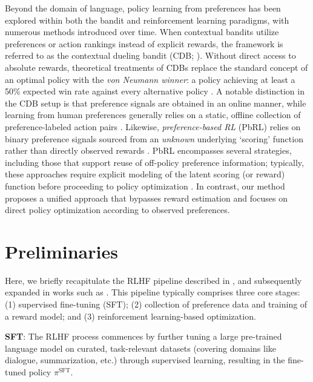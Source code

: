 Beyond the domain of language, policy learning from preferences has been explored within both the bandit and reinforcement learning paradigms, with numerous methods introduced over time. When contextual bandits utilize preferences or action rankings instead of explicit rewards, the framework is referred to as the contextual dueling bandit (CDB; \cite{yue2012karmed,dudik2015contextual}). Without direct access to absolute rewards, theoretical treatments of CDBs replace the standard concept of an optimal policy with the \textit{von Neumann winner}: a policy achieving at least a 50\% expected win rate against every alternative policy \citep{dudik2015contextual}. A notable distinction in the CDB setup is that preference signals are obtained in an online manner, while learning from human preferences generally relies on a static, offline collection of preference-labeled action pairs \citep{yan2022human}. Likewise, \textit{preference-based RL} (PbRL) relies on binary preference signals sourced from an \textit{unknown} underlying `scoring' function rather than directly observed rewards \citep{BusaFekete2014,ruiz2023dueling}. PbRL encompasses several strategies, including those that support reuse of off-policy preference information; typically, these approaches require explicit modeling of the latent scoring (or reward) function before proceeding to policy optimization \citep{jain2013learning,BusaFekete2014,christiano2017deep,sadigh2017active,kupcsik2018learning}. In contrast, our method proposes a unified approach that bypasses reward estimation and focuses on direct policy optimization according to observed preferences.

\section{Preliminaries}\label{section:prelims}

Here, we briefly recapitulate the RLHF pipeline described in \citeauthor{ziegler2020finetuning}, and subsequently expanded in works such as \citep{stiennon2022learning, bai2022training, ouyang2022training}. This pipeline typically comprises three core stages: (1) supervised fine-tuning (SFT); (2) collection of preference data and training of a reward model; and (3) reinforcement learning-based optimization.

\textbf{SFT}: The RLHF process commences by further tuning a large pre-trained language model on curated, task-relevant datasets (covering domains like dialogue, summarization, etc.) through supervised learning, resulting in the fine-tuned policy $\pi^\text{SFT}$.


